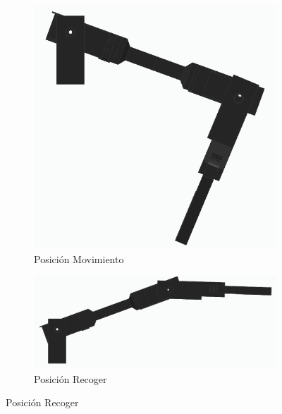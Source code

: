 \begin{figure}[H]
    \centering
    \begin{subfigure}[b]{0.4\textwidth}
        \centering
        \includegraphics[width=\textwidth]{imagenes/brazo_movimiento.png}
        \caption{Posición Movimiento}
    \end{subfigure}
    \hfill
    \begin{subfigure}[b]{0.4\textwidth}
        \centering
        \includegraphics[width=\textwidth]{imagenes/brazo_recoger.png}
        \caption{Posición Recoger}
    \end{subfigure}

    \vspace{0.5cm}


\end{figure}

